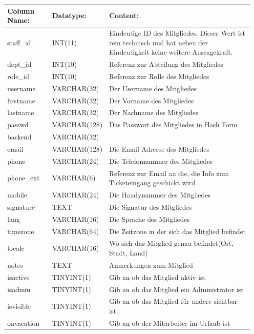 \begin{table}[]
	\begin{tabular}{|p{3.5cm}|p{4cm}|p{7.2cm}|}
		\hline
		\textbf{Column Name:} & \textbf{Datatype:} & \textbf{Content:}\\
		\hline
		staff\_id & INT(11) & Eindeutige ID des Mitgliedes. Dieser Wert ist rein technisch und hat neben der Eindeutigkeit keine weitere 
		Aussagekraft.\\
		\hline
		dept\_id & INT(10) & Referenz zur Abteilung des Mitgliedes \\
		\hline
		role\_id & INT(10) & Referenz zur Rolle des Mitgliedes\\
		\hline
		username & VARCHAR(32) & Der Username des Mitgliedes\\
		\hline
		firstname & VARCHAR(32) & Der Vorname des Mitgliedes\\
		\hline
		lastname & VARCHAR(32) &  Der Nachname des Mitgliedes\\
		\hline
		passwd & VARCHAR(128) & Das Passwort des Mitgliedes in Hash Form \\
		\hline
		backend & VARCHAR(32) & \\
		\hline
		email & VARCHAR(128) & Die Email-Adresse des Mitgliedes \\
		\hline
		phone & VARCHAR(24) & Die Telefonnummer des Mitgliedes \\
		\hline
		phone\_ext & VARCHAR(6) & Referenz zur Email an die, die Info zum Ticketeingang geschickt wird \\
		\hline
		mobile & VARCHAR(24) & Die Handynummer des Mitgliedes \\
		\hline
		signature & TEXT & Die Signatur des Mitgliedes \\
		\hline
		lang & VARCHAR(16) & Die Sprache des Mitgliedes \\
		\hline
		timezone & VARCHAR(64) & Die Zeitzone in der sich das Mitglied befindet \\
		\hline
		locale & VARCHAR(16)& Wo sich das Mitglied genau befindet(Ort, Stadt, Land) \\
		\hline
		notes & TEXT & Anmerkungen zum Mitglied\\
		\hline
		isactive & TINYINT(1) & Gib an ob das Mitglied aktiv ist\\
		\hline
		isadmin & TINYINT(1) & Gib an ob das Mitglied ein Administrator ist\\
		\hline
		isvisible & TINYINT(1) & Gib an ob das Mitglied für andere sichtbar ist \\
		\hline
		onvacation & TINYINT(1) & Gib an ob der Mitarbeiter im Urlaub ist \\

\end{tabular}
\end{table}
